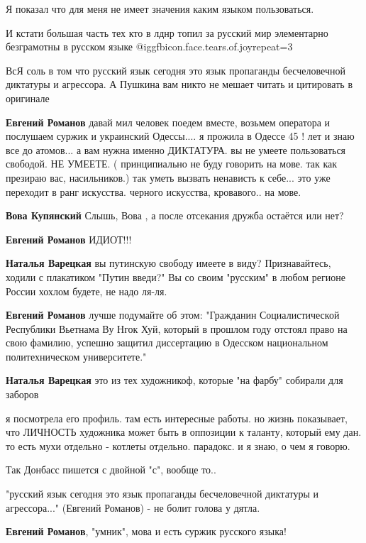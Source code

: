 \begin{itemize}
\begin{itemize}
Я показал что для меня не имеет значения каким языком пользоваться.

И кстати большая часть тех кто в лднр топил за русский мир элементарно
безграмотны в русском языке  @igg{fbicon.face.tears.of.joy}{repeat=3} 

ВсЯ соль в том что русский язык сегодня это язык пропаганды бесчеловечной
диктатуры и агрессора. А Пушкина вам никто не мешает читать и цитировать в
оригинале

\textbf{Евгений Романов} давай мил человек поедем вместе, возьмем оператора и послушаем суржик и украинский Одессы.... я прожила в Одессе 45 ! лет и знаю все до атомов...
а вам нужна именно ДИКТАТУРА. вы не умеете пользоваться свободой. НЕ УМЕЕТЕ.
( принципиально не буду говорить на мове. так как презираю вас, насильников.)
так уметь вызвать ненависть к себе... это уже переходит в ранг искусства. черного искусства, кровавого..
на мове.

\textbf{Вова Купянский} Слышь, Вова , а после отсекания дружба остаётся или нет?

\textbf{Евгений Романов} ИДИОТ!!!

\textbf{Наталья Варецкая} вы путинскую свободу имеете в виду? Признавайтесь, ходили с плакатиком "Путин введи?"
Вы со своим "русским" в любом регионе России хохлом будете, не надо ля-ля.

\textbf{Евгений Романов} лучше подумайте об этом:
"Гражданин Социалистической Республики Вьетнама Ву Нгок Хуй, который в прошлом году отстоял право на свою фамилию, успешно защитил диссертацию в Одесском национальном политехническом университете."

\textbf{Наталья Варецкая} это из тех художникоф, которые "на фарбу" собирали для заборов

я посмотрела его профиль. там есть интересные работы.
но жизнь показывает, что ЛИЧНОСТЬ художника может быть в оппозиции к таланту, который ему дан. то есть мухи отдельно - котлеты отдельно. парадокс.
и я знаю, о чем я говорю.

Так Донбасс пишется с двойной "с", вообще то..


"русский язык сегодня это язык пропаганды бесчеловечной диктатуры и
агрессора..." (Евгений Романов) - не болит голова у дятла.

\textbf{Евгений Романов}, "умник", мова и есть суржик русского языка!


\end{itemize}
\end{itemize}
